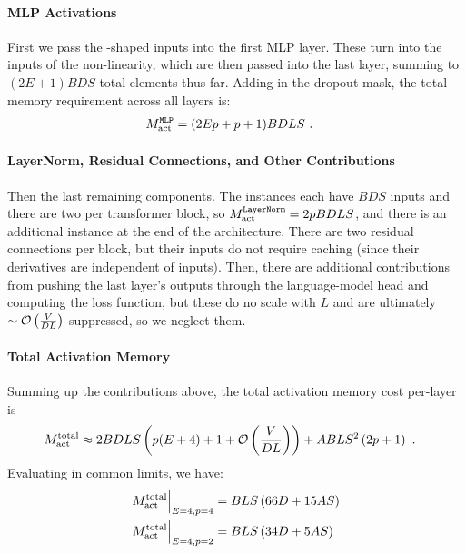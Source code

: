 \documentclass[11pt]{article}
\begin{document}
\paragraph{MLP Activations}

First we pass the -shaped inputs into the first MLP layer. These turn into the
 inputs of the non-linearity, which are then passed into the last
 layer, summing to $ (2E+1)BDS $ total elements thus far. Adding in the dropout
mask, the total memory requirement across all  layers is:
\begin{align}
	M _{ \rm act  } ^\texttt{MLP} & = (2Ep+p+1)BDLS\ .
	\label{eq_mlp_actmem_vanilla}
\end{align}


\paragraph{LayerNorm, Residual Connections, and Other Contributions}

Then the last remaining components. The  instances each have $ BDS $ inputs and
there are two per transformer block, so $ M _{ {\rm  act}  } ^\texttt{LayerNorm} = 2pBDLS $, and
there is an additional instance at the end of the architecture. There are two residual connections
per block, but their inputs do not require caching (since their derivatives are independent of
inputs). Then, there are additional contributions from pushing the last layer's outputs through the
language-model head and computing the loss function, but these do no scale with $ L $ and are
ultimately $ \sim \mathcal{O} \left( \frac{ V }{ DL } \right)  $ suppressed, so we neglect them.





\paragraph{Total Activation Memory}


Summing up the contributions above, the total activation memory cost per-layer is
\begin{align}
	M _{ {\rm act}  } ^{ {\rm  total}  } & \approx  2BDLS   \left ( p(E+4) + 1 + \mathcal{O} \left( \frac{
		V}{ DL } \right)  \right )
	+ ABLS ^{ 2 } \left ( 2p+1\right ) \label{eq_act_mem_total_no_sharding}\ .
\end{align}
Evaluating in common limits, we have:
\begin{align}
	M _{ {\rm act}  } ^{ {\rm  total}  } \Big| _{ E=4, p=4 } & =BLS \left ( 66 D+15AS  \right ) \nonumber\\
	M _{ {\rm act}  } ^{ {\rm  total}  } \Big| _{ E=4, p=2 } & =BLS \left ( 34 D+5AS  \right )
\end{align}
\end{document}
